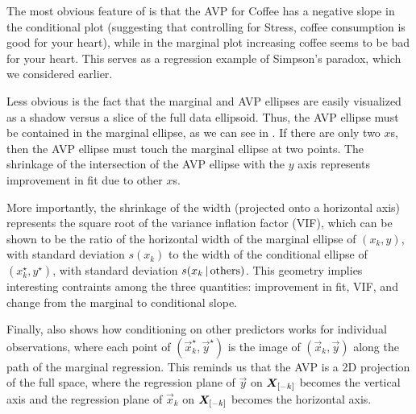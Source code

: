 The most obvious feature of  is that the AVP for Coffee has a negative slope in the conditional
plot (suggesting that controlling for Stress, coffee consumption is good for your heart), while
in the marginal plot increasing coffee seems to be bad for your heart. This serves as a
regression example of Simpson's paradox, which we considered earlier.

Less obvious is the fact that
the marginal and AVP ellipses are easily visualized as a shadow versus a slice of the full data ellipsoid.
Thus, the AVP ellipse must be contained in the marginal ellipse, as we can see in .
If there are only two $x$s, then the AVP ellipse must touch the marginal ellipse at two points.
The shrinkage of the intersection of the AVP ellipse with the $y$ axis represents improvement in fit due to other $x$s.

More importantly, the shrinkage of the width (projected onto a horizontal axis) represents the
square root of the variance inflation factor (VIF), which can be shown to be the ratio of the horizontal
width of the marginal ellipse of $(x_k, y)$, with standard deviation $s(x_k)$ to the width of the conditional
ellipse of $(x_k^\star, y^\star)$, with standard deviation $s(x_k \, | \, \textrm{others})$.
This geometry implies interesting contraints among the three quantities: improvement in fit, VIF, and change from the marginal to conditional slope.

Finally,  also shows how conditioning on other predictors works for individual
observations, where each point of  $(\vec{x}_k^\star, \vec{y}^\star)$ is the image of $(\vec{x}_k, \vec{y})$
along the path of the marginal regression. This reminds us that the AVP is a 2D projection of the full space,
where the regression plane of $\vec{y}$ on $\bm{X}_{[-k]}$ becomes the vertical axis and
the regression plane of $\vec{x}_k$ on $\bm{X}_{[-k]}$ becomes the horizontal axis.

